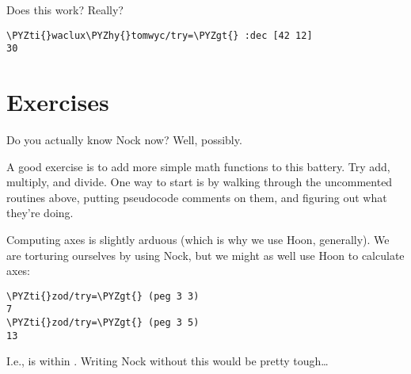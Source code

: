 Does this work?  Really?

\begin{framed_shaded}
\begin{Verbatim}[fontsize=\relsize{-2.5},fontseries=b,commandchars=\\\{\}]
\PYZti{}waclux\PYZhy{}tomwyc/try=\PYZgt{} :dec [42 12]
30
\end{Verbatim}
\end{framed_shaded}

\section{Exercises}

Do you actually know Nock now?  Well, possibly.

A good exercise is to add more simple math functions to this
battery.  Try add, multiply, and divide.  One way to start is by
walking through the uncommented routines above, putting
pseudocode comments on them, and figuring out what they're doing.

Computing axes is slightly arduous (which is why we use Hoon,
generally).  We are torturing ourselves by using Nock, but we
might as well use Hoon to calculate axes:

\begin{framed_shaded}
\begin{Verbatim}[fontsize=\relsize{-2.5},fontseries=b,commandchars=\\\{\}]
\PYZti{}zod/try=\PYZgt{} (peg 3 3)
7
\PYZti{}zod/try=\PYZgt{} (peg 3 5)
13
\end{Verbatim}
\end{framed_shaded}

I.e.,  is  within .  Writing Nock without this
would be pretty tough\ldots{}
